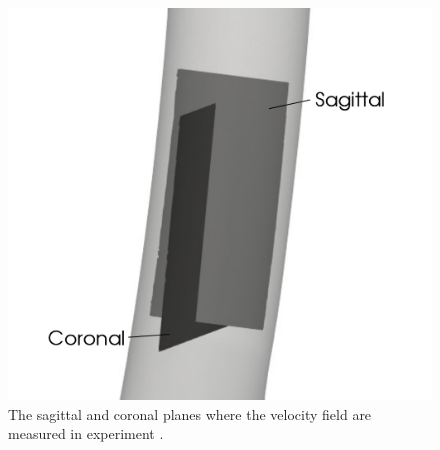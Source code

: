 \begin{figure}[htbp]
\begin{minipage}[c][8cm][c]{0.15\textwidth}
    \end{minipage}
    \begin{minipage}[c][8cm][c]{0.2\textwidth} 
    \includegraphics[scale=0.25]{imgs/vena_cava/venacava_piv3.pdf}
    \end{minipage} 
    \caption{The sagittal and coronal planes where the velocity field are measured in experiment \cite{gallagher_exp}.}
    \label{fig:IVCPIV}
\end{figure}

